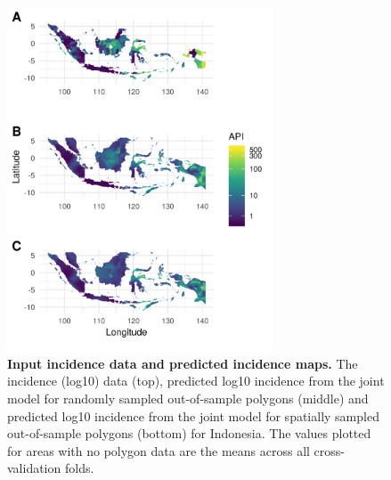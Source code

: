 \documentclass[10pt,letterpaper]{article}
\begin{document}













\begin{figure}
\includegraphics[width = 0.7\textwidth]{figures/idn_both_cv12_preds.png}
\caption{{\bf Input incidence data and predicted incidence maps. } 
The incidence (log10) data (top), predicted log10 incidence from the joint model for randomly sampled out-of-sample polygons (middle) and predicted log10 incidence from the joint model for spatially sampled out-of-sample polygons (bottom) for Indonesia. The values plotted for areas with no polygon data are the means across all cross-validation folds.
}
\label{predobsmapidn}
\end{figure}
\end{document}
